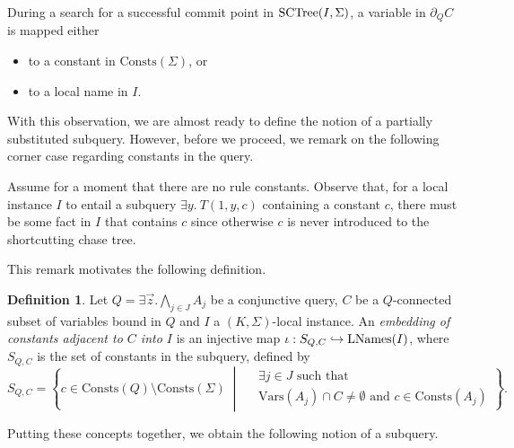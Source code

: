 \documentclass[12pt]{report}
\theoremstyle{plain}
\theoremstyle{definition}
\newtheorem{definition}[theorem]{Definition}
\def\Vars{{\mathrm{Vars}}}
\def\Consts{{\mathrm{Consts}}}
\newcommand{\SCTree}[2]{\ensuremath{\normalfont{\textrm{SCTree}}\!\left( #1, #2 \right)}}
\newcommand{\LNames}[1]{\ensuremath{\normalfont{\textrm{LNames}}\!\left( #1 \right)}}
\begin{document}
During a search for a successful commit point in $\SCTree{I}{\Sigma}$, a variable in $\partial_Q C$ is mapped either
\begin{itemize}
  \item to a constant in $\Consts(\Sigma)$, or
  \item to a local name in $I$.
\end{itemize}

With this observation, we are almost ready to define the notion of a partially substituted subquery. However, before we proceed, we remark on the following corner case regarding constants in the query.

Assume for a moment that there are no rule constants. Observe that, for a local instance $I$ to entail a subquery $\exists y.\ T(1, y, c)$ containing a constant $c$, there must be some fact in $I$ that contains $c$ since otherwise $c$ is never introduced to the shortcutting chase tree.

This remark motivates the following definition.

\begin{definition}
\label{definition:embedding-of-constants-adjacent-to-c}
  Let $Q = \exists \vec{z}. \bigwedge_{j \in J} A_j$ be a conjunctive query, $C$ be a $Q$-connected subset of variables bound in $Q$ and $I$ a $(K, \Sigma)$-local instance. An \emph{embedding of constants adjacent to $C$ into $I$} is an injective map $\iota: S_{Q, C} \hookrightarrow \LNames{I}$, where $S_{Q, C}$ is the set of constants in the subquery, defined by $$
  S_{Q, C} = \left\{
      c \in \Consts(Q) \setminus \Consts(\Sigma)
        \;\middle|\;
      \begin{aligned}
        & \exists j \in J \text{ such that } \\
        & \Vars(A_j) \cap C \neq \emptyset \text{ and } c \in \Consts(A_j)
      \end{aligned}
    \right\}.
  $$
\end{definition}

Putting these concepts together, we obtain the following notion of a subquery.
\end{document}
